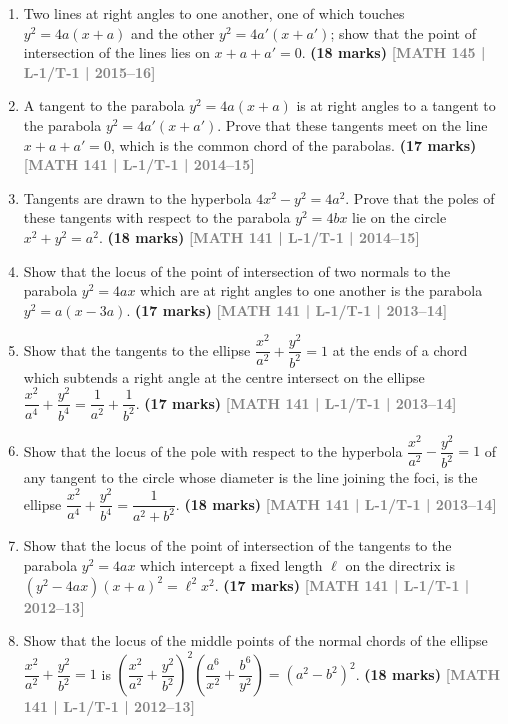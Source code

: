 \documentclass[12pt,a4paper]{article}
\newcommand{\yr}[1]{\hfill\textcolor{gray}{\small\textbf{[#1]}}}
\newcommand{\mk}[1]{\textcolor{orange!70!black}{\small\textbf{(#1 marks)}}}
\begin{document}
\begin{enumerate}
\item Two lines at right angles to one another, one of which touches $y^{2}=4a(x+a)$ and the other $y^{2}=4a'(x+a')$; show that the point of intersection of the lines lies on $x+a+a'=0$.
\mk{18} \yr{MATH 145 | L-1/T-1 | 2015--16}

\item A tangent to the parabola $y^{2}=4a(x+a)$ is at right angles to a tangent to the parabola $y^{2}=4a'(x+a')$. Prove that these tangents meet on the line $x+a+a'=0$, which is the common chord of the parabolas.
\mk{17} \yr{MATH 141 | L-1/T-1 | 2014--15}

\item Tangents are drawn to the hyperbola $4x^{2}-y^{2}=4a^{2}$. Prove that the poles of these tangents with respect to the parabola $y^{2}=4bx$ lie on the circle $x^{2}+y^{2}=a^{2}$.
\mk{18} \yr{MATH 141 | L-1/T-1 | 2014--15}

\item Show that the locus of the point of intersection of two normals to the parabola $y^{2}=4ax$ which are at right angles to one another is the parabola $y^{2}=a(x-3a)$.
\mk{17} \yr{MATH 141 | L-1/T-1 | 2013--14}

\item Show that the tangents to the ellipse $\dfrac{x^{2}}{a^{2}}+\dfrac{y^{2}}{b^{2}}=1$ at the ends of a chord which subtends a right angle at the centre intersect on the ellipse $\dfrac{x^{2}}{a^{4}}+\dfrac{y^{2}}{b^{4}}=\dfrac{1}{a^{2}}+\dfrac{1}{b^{2}}$.
\mk{17} \yr{MATH 141 | L-1/T-1 | 2013--14}

\item Show that the locus of the pole with respect to the hyperbola $\dfrac{x^{2}}{a^{2}}-\dfrac{y^{2}}{b^{2}}=1$ of any tangent to the circle whose diameter is the line joining the foci, is the ellipse $\dfrac{x^{2}}{a^{4}}+\dfrac{y^{2}}{b^{4}}=\dfrac{1}{a^{2}+b^{2}}$.
\mk{18} \yr{MATH 141 | L-1/T-1 | 2013--14}

\item Show that the locus of the point of intersection of the tangents to the parabola $y^{2}=4ax$ which intercept a fixed length $\ell$ on the directrix is $(y^{2}-4ax)(x+a)^{2}=\ell^{2}x^{2}$.
\mk{17} \yr{MATH 141 | L-1/T-1 | 2012--13}

\item Show that the locus of the middle points of the normal chords of the ellipse $\dfrac{x^{2}}{a^{2}}+\dfrac{y^{2}}{b^{2}}=1$ is $\left(\dfrac{x^{2}}{a^{2}}+\dfrac{y^{2}}{b^{2}}\right)^{2}\!\left(\dfrac{a^{6}}{x^{2}}+\dfrac{b^{6}}{y^{2}}\right)=(a^{2}-b^{2})^{2}$.
\mk{18} \yr{MATH 141 | L-1/T-1 | 2012--13}


\end{enumerate}
\end{document}
